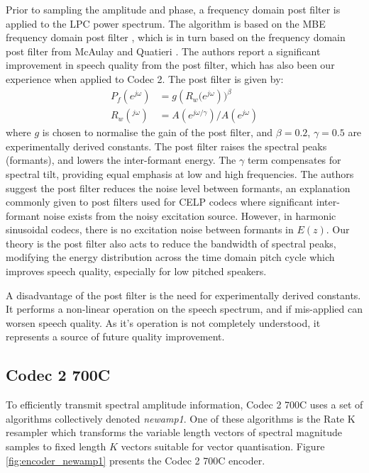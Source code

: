 \documentclass{article}
\begin{document}
{Prior to sampling the amplitude and phase, a frequency domain post filter is applied to the LPC power spectrum. The algorithm is based on the MBE frequency domain post filter \cite[Section 8.6, p 267]{kondoz1994digital}, which is in turn based on the frequency domain post filter from McAulay and Quatieri \cite[Section 4.3, p 148]{kleijn1995speech}.  The authors report a significant improvement in speech quality from the post filter, which has also been our experience when applied to Codec 2. The post filter is given by:
\begin{equation}
\label{eq:lpc_lsp_pf}
\begin{split}
P_f(e^{j\omega}) &= g \left( R_w(e^{j \omega} \right))^\beta \\
R_w(^{j\omega}) &= A(e^{j \omega/ \gamma})/A(e^{j \omega})
\end{split}
\end{equation}
where $g$ is chosen to normalise the gain of the post filter, and $\beta=0.2$, $\gamma=0.5$ are experimentally derived constants.  The post filter raises the spectral peaks (formants), and lowers the inter-formant energy.  The $\gamma$ term compensates for spectral tilt, providing equal emphasis at low and high frequencies.  The authors suggest the post filter reduces the noise level between formants, an explanation commonly given to post filters used for CELP codecs where significant inter-formant noise exists from the noisy excitation source.  However, in harmonic sinusoidal codecs, there is no excitation noise between formants in $E(z)$.  Our theory is the post filter also acts to reduce the bandwidth of spectral peaks, modifying the energy distribution across the time domain pitch cycle which improves speech quality, especially for low pitched speakers.

A disadvantage of the post filter is the need for experimentally derived constants.  It performs a non-linear operation on the speech spectrum, and if mis-applied can worsen speech quality.  As it's operation is not completely understood, it represents a source of future quality improvement.

\subsection{Codec 2 700C}
\label{sect:mode_newamp1}

To efficiently transmit spectral amplitude information, Codec 2 700C uses a set of algorithms collectively denoted \emph{newamp1}.  One of these algorithms is the Rate K resampler which transforms the variable length vectors of spectral magnitude samples to fixed length $K$ vectors suitable for vector quantisation. Figure \ref{fig:encoder_newamp1} presents the Codec 2 700C encoder.  

}
\end{document}

